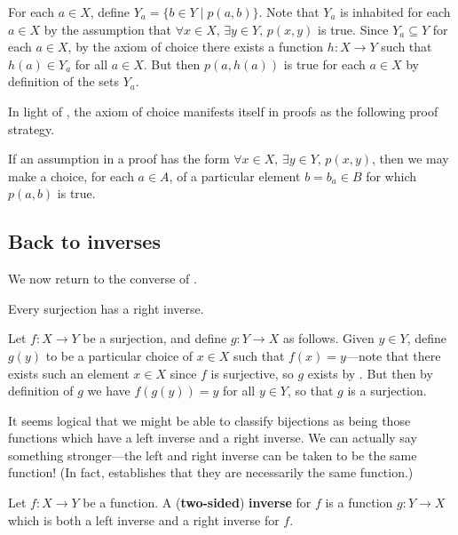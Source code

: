 \begin{cproof}
For each $a \in X$, define $Y_a = \{ b \in Y \mid p(a,b) \}$. Note that $Y_a$ is inhabited for each $a \in X$ by the assumption that $\forall x \in X,\, \exists y \in Y,\, p(x,y)$ is true. Since $Y_a \subseteq Y$ for each $a \in X$, by the axiom of choice there exists a function $h : X \to Y$ such that $h(a) \in Y_a$ for all $a \in X$. But then $p(a,h(a))$ is true for each $a \in X$ by definition of the sets $Y_a$.
\end{cproof}

In light of , the axiom of choice manifests itself in proofs as the following proof strategy.

\begin{strategyac}
\label{strUsingAC}
If an assumption in a proof has the form $\forall x \in X,\, \exists y \in Y,\, p(x,y)$, then we may make a choice, for each $a \in A$, of a particular element $b = b_a \in B$ for which $p(a,b)$ is true.
\end{strategyac}

\subsection*{Back to inverses}

We now return to the converse of .

\begin{propositionac}
Every surjection has a right inverse.
\end{propositionac}

\begin{cproof}
Let $f : X \to Y$ be a surjection, and define $g : Y \to X$ as follows. Given $y \in Y$, define $g(y)$ to be a particular choice of $x \in X$ such that $f(x) = y$---note that there exists such an element $x \in X$ since $f$ is surjective, so $g$ exists by . But then by definition of $g$ we have $f(g(y)) = y$ for all $y \in Y$, so that $g$ is a surjection.
\end{cproof}

It seems logical that we might be able to classify bijections as being those functions which have a left inverse and a right inverse. We can actually say something stronger---the left and right inverse can be taken to be the same function! (In fact,  establishes that they are necessarily the same function.)

\begin{definition}
\label{defInverse}
Let $f : X \to Y$ be a function. A (\textbf{two-sided}) \textbf{inverse} for $f$ is a function $g : Y \to X$ which is both a left inverse and a right inverse for $f$.
\end{definition}

